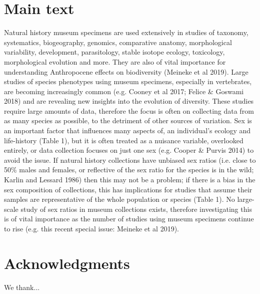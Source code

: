 \documentclass[a4paper, 12pt]{article}
\begin{document}
\section{Main text}\label{main}
Natural history museum specimens are used extensively in studies of taxonomy, systematics, biogeography, genomics, comparative anatomy, morphological variability, development, parasitology, stable isotope ecology, toxicology, morphological evolution and more\cite{lister2011natural,pyke2010biological,mclean2015natural}. 
They are also of vital importance for understanding Anthropocene effects on biodiversity (Meineke et al 2019). 
Large studies of species phenotypes using museum specimens, especially in vertebrates, are becoming increasingly common (e.g. Cooney et al 2017; Felice \& Goswami 2018) and are revealing new insights into the evolution of diversity. These studies require large amounts of data, therefore the focus is often on collecting data from as many species as possible, to the detriment of other sources of variation. Sex is an important factor that influences many aspects of, an individual's ecology and life-history (Table 1), but it is often treated as a nuisance variable, overlooked entirely, or data collection focuses on just one sex (e.g. Cooper \& Purvis 2014) to avoid the issue. If natural history collections have unbiased sex ratios (i.e. close to 50\% males and females, or reflective of the sex ratio for the species is in the wild; Karlin and Lessard 1986) then this may not be a problem; if there is a bias in the sex composition of collections, this has implications for studies that assume their samples are representative of the whole population or species (Table 1). No large-scale study of sex ratios in museum collections exists, therefore investigating this is of vital importance as the number of studies using museum specimens continue to rise (e.g. this recent special issue: Meineke et al 2019).



\section{Acknowledgments}\label{acknowledgments}
We thank...




\end{document}
